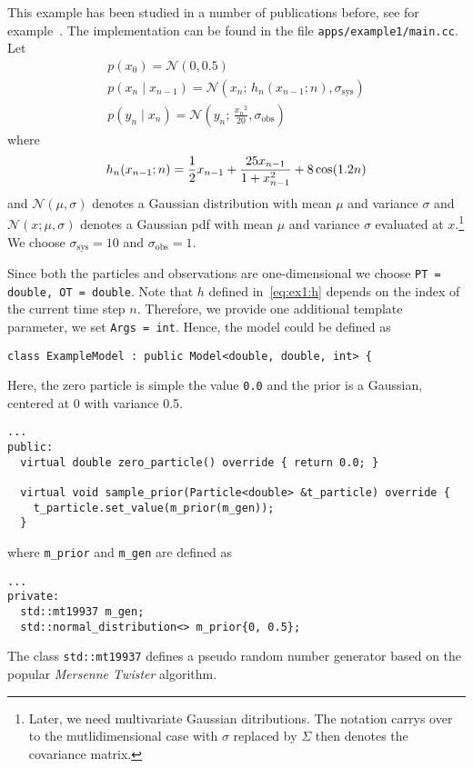 \begin{example}\label{ex:1}
  This example has been studied in a number of publications before,
  see for example~\cite{arulampalam,gordon,kitagawa}. The
  implementation can be found in the file
  \texttt{apps/example1/main.cc}. Let
  \begin{gather*}
    p(x_0) = \mathcal{N}(0,0.5)\\
    p(x_n \mid x_{n-1}) = \mathcal{N}(x_n;\, h_n(x_{n-1};n), \sigma_{\text{sys}})\\
    p(y_n \mid x_n) = \mathcal{N}(y_n;\, \frac{{x_n}^2}{20},
    \sigma_{\text{obs}})
  \end{gather*}
  where
  \begin{equation}
    \label{eq:ex1:h}
    h_n(x_{n-1};n) = \frac{1}{2}x_{n-1} + \frac{25 x_{n-1}}{1 + x_{n-1}^2} + 8 \cos(1.2n) \\
  \end{equation}
  and $\mathcal{N}(\mu, \sigma)$ denotes a Gaussian distribution with
  mean $\mu$ and variance $\sigma$ and $\mathcal{N}(x; \mu, \sigma)$ denotes a Gaussian pdf with
  mean $\mu$ and variance $\sigma$ evaluated at $x$.\footnote{Later,
    we need multivariate Gaussian ditributions. The notation carrys
    over to the mutlidimensional case with $\sigma$ replaced by
    $\Sigma$ then denotes the covariance matrix.} We choose
  $\sigma_{\text{sys}} = 10$ and $\sigma_{\text{obs}} = 1$.

  Since both the particles and observations are one-dimensional we
  choose \texttt{PT = double,\ OT = double}. Note that $h$ defined
  in~\eqref{eq:ex1:h} depends on the index of the current time step
  $n$. Therefore, we provide one additional template parameter, \ie we
  set \texttt{Args = int}. Hence, the model could be defined as
\begin{verbatim}
class ExampleModel : public Model<double, double, int> {
\end{verbatim}
  Here, the zero particle is simple the value \texttt{0.0} and the
  prior is a Gaussian, centered at 0 with variance 0.5.
\begin{verbatim}
...
public:
  virtual double zero_particle() override { return 0.0; }

  virtual void sample_prior(Particle<double> &t_particle) override {
    t_particle.set_value(m_prior(m_gen));
  }
\end{verbatim}
  where \texttt{m\_prior} and \texttt{m\_gen} are defined as
\begin{verbatim}
...
private:
  std::mt19937 m_gen;
  std::normal_distribution<> m_prior{0, 0.5};
\end{verbatim}
  The class \texttt{std::mt19937} defines a pseudo random number
  generator based on the popular \emph{Mersenne Twister} algorithm.


\end{example}
